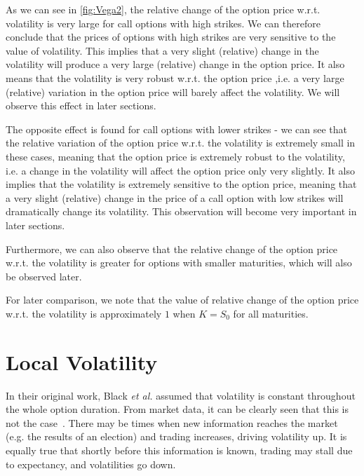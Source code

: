 As we can see in \autoref{fig:Vega2}, the relative change of the option price w.r.t. volatility is very large for call options with high strikes. We can therefore conclude that the prices of options with high strikes are very sensitive to the value of volatility. This implies that a very slight (relative) change in the volatility will produce a very large (relative) change in the option price. It also means that the volatility is very robust w.r.t. the option price ,i.e. a very large (relative) variation in the option price will barely affect the volatility. We will observe this effect in later sections.

The opposite effect is found for call options with lower strikes - we can see that the relative variation of the option price w.r.t. the volatility is extremely small in these cases, meaning that the option price is extremely robust to the volatility, i.e. a change in the volatility will affect the option price only very slightly. It also implies that the volatility is extremely sensitive to the option price, meaning that a very slight (relative) change in the price of a call option with low strikes will dramatically change its volatility. This observation will become very important in later sections.

Furthermore, we can also observe that the relative change of the option price w.r.t. the volatility is greater for options with smaller maturities, which will also be observed later.

For later comparison, we note that the value of relative change of the option price w.r.t. the volatility is approximately $1$ when $K=S_0$ for all maturities.

\section{Local Volatility}
\label{section:localvolatility}
In their original work, Black \textit{et al.} assumed that volatility is constant throughout the whole option duration. From market data, it can be clearly seen that this is not the case~\citep{DJIA}. There may be times when new information reaches the market  (e.g. the results of an election) and trading increases, driving volatility up. It is equally true that shortly before this information is known, trading may stall due to expectancy, and volatilities go down. 

